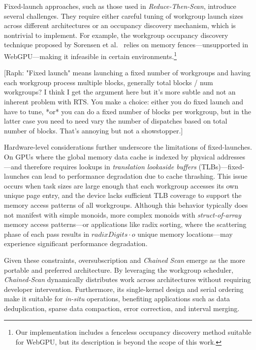 \documentclass[sigconf]{acmart}
\newcommand{\raph}[1]{{\footnotesize\color{magenta}[Raph: #1]}}
\begin{document}
Fixed-launch approaches, such as those used in \emph{Reduce-Then-Scan}, introduce several challenges. They require either careful tuning of workgroup launch sizes across different architectures or an occupancy discovery mechanism, which is nontrivial to implement. For example, the workgroup occupancy discovery technique proposed by Sorensen et al.~\cite{sorensen2016} relies on memory fences—unsupported in WebGPU—making it infeasible in certain environments.\footnote{Our implementation includes a fenceless occupancy discovery method suitable for WebGPU, but its description is beyond the scope of this work.}

\raph{"Fixed launch" means launching a fixed number of workgroups and having each workgroup process multiple blocks, generally total blocks / num workgroups? I think I get the argument here but it's more subtle and not an inherent problem with RTS. You make a choice: either you do fixed launch and have to tune, *or* you can do a fixed number of blocks per workgroup, but in the latter case you need to need vary the number of dispatches based on total number of blocks. That's annoying but not a showstopper.}

Hardware-level considerations further underscore the limitations of fixed-launches. On GPUs where the global memory data cache is indexed by physical addresses---and therefore requires lookups in \emph{translation lookaside buffers} (TLBs)---fixed-launches can lead to performance degradation due to cache thrashing. This issue occurs when task sizes are large enough that each workgroup accesses its own unique page entry, and the device lacks sufficient TLB coverage to support the memory access patterns of all workgroups. Although this behavior typically does not manifest with simple monoids, more complex monoids with \emph{struct-of-array} memory access patterns---or applications like radix sorting, where the scattering phase of each pass results in $radixDigits \cdot o$ unique memory locations---may experience significant performance degradation.

Given these constraints, oversubscription and \emph{Chained Scan} emerge as the more portable and preferred architecture. By leveraging the workgroup scheduler, \emph{Chained-Scan} dynamically distributes work across architectures without requiring developer intervention. Furthermore, its single-kernel design and serial ordering make it suitable for \emph{in-situ} operations, benefiting applications such as data deduplication, sparse data compaction, error correction, and interval merging.
\end{document}
